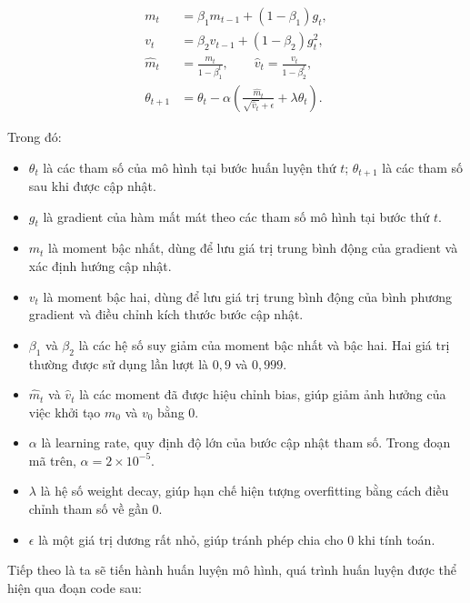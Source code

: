 \begin{align}
    m_t &= \beta_1 m_{t-1} + (1-\beta_1)g_t, \\
    v_t &= \beta_2 v_{t-1} + (1-\beta_2)g_t^2, \\
    \hat{m}_t &= \frac{m_t}{1-\beta_1^t}, \qquad
    \hat{v}_t = \frac{v_t}{1-\beta_2^t}, \\
    \theta_{t+1} &= \theta_t - \alpha \left( \frac{\hat{m}_t}{\sqrt{\hat{v}_t} + \epsilon} + \lambda \theta_t \right).
\end{align}


Trong đó:
\begin{itemize}
    \item $\theta_t$ là các tham số của mô hình tại bước huấn luyện thứ $t$; $\theta_{t+1}$ là các tham số sau khi được cập nhật.
    \item $g_t$ là gradient của hàm mất mát theo các tham số mô hình tại bước thứ $t$.
    \item $m_t$ là moment bậc nhất, dùng để lưu giá trị trung bình động của gradient và xác định hướng cập nhật.
    \item $v_t$ là moment bậc hai, dùng để lưu giá trị trung bình động của bình phương gradient và điều chỉnh kích thước bước cập nhật.
    \item $\beta_1$ và $\beta_2$ là các hệ số suy giảm của moment bậc nhất và bậc hai. Hai giá trị thường được sử dụng lần lượt là $0{,}9$ và $0{,}999$.
    \item $\hat{m}_t$ và $\hat{v}_t$ là các moment đã được hiệu chỉnh bias, giúp giảm ảnh hưởng của việc khởi tạo $m_0$ và $v_0$ bằng 0.
    \item $\alpha$ là learning rate, quy định độ lớn của bước cập nhật tham số. Trong đoạn mã trên, $\alpha=2\times10^{-5}$.
    \item $\lambda$ là hệ số weight decay, giúp hạn chế hiện tượng overfitting bằng cách điều chỉnh tham số về gần 0.
    \item $\epsilon$ là một giá trị dương rất nhỏ, giúp tránh phép chia cho 0 khi tính toán.
\end{itemize}
Tiếp theo là ta sẽ tiến hành huấn luyện mô hình, quá trình huấn luyện được thể hiện qua đoạn code sau:

